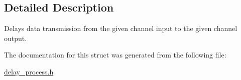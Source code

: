 \subsection{Detailed Description}
Delays data transmission from the given channel input to the given channel output. 

The documentation for this struct was generated from the following file\-:\begin{DoxyCompactItemize}
\item 
\hyperlink{delay__process_8h}{delay\-\_\-process.\-h}\end{DoxyCompactItemize}
